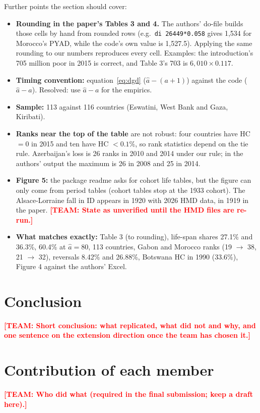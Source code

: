 \documentclass[12pt,a4paper]{article}
\newcommand{\todo}[1]{\textbf{\textcolor{red}{[TEAM: #1]}}}
\newcommand{\ahat}{\hat{a}}
\begin{document}
Further points the section should cover:
\begin{itemize}
  \item \textbf{Rounding in the paper's Tables 3 and 4.} The authors' do-file builds those cells by hand from rounded rows (e.g.\ \texttt{di 26449*0.058} gives 1,534 for Morocco's PYAD, while the code's own value is 1,527.5). Applying the same rounding to our numbers reproduces every cell. Examples: the introduction's 705 million poor in 2015 is correct, and Table 3's 703 is $6{,}010\times0.117$.
  \item \textbf{Timing convention:} equation~\eqref{eq:dgd} ($\ahat-(a+1)$) against the code ($\ahat-a$). Resolved: use $\ahat-a$ for the empirics.
  \item \textbf{Sample:} 113 against 116 countries (Eswatini, West Bank and Gaza, Kiribati).
  \item \textbf{Ranks near the top of the table} are not robust: four countries have HC $=0$ in 2015 and ten have HC $<0.1\%$, so rank statistics depend on the tie rule. Azerbaijan's loss is 26 ranks in 2010 and 2014 under our rule; in the authors' output the maximum is 26 in 2008 and 25 in 2014.
  \item \textbf{Figure 5:} the package readme asks for cohort life tables, but the figure can only come from period tables (cohort tables stop at the 1933 cohort). The Alsace-Lorraine fall in ID appears in 1920 with 2026 HMD data, in 1919 in the paper. \todo{State as unverified until the HMD files are re-run.}
  \item \textbf{What matches exactly:} Table 3 (to rounding), life-span shares 27.1\% and 36.3\%, 60.4\% at $\ahat=80$, 113 countries, Gabon and Morocco ranks (19 $\to$ 38, 21 $\to$ 32), reversals 8.42\% and 26.88\%, Botswana HC in 1990 (33.6\%), Figure 4 against the authors' Excel.
\end{itemize}

\section{Conclusion}
\todo{Short conclusion: what replicated, what did not and why, and one sentence on the extension direction once the team has chosen it.}

\section*{Contribution of each member}
\todo{Who did what (required in the final submission; keep a draft here).}
\end{document}
